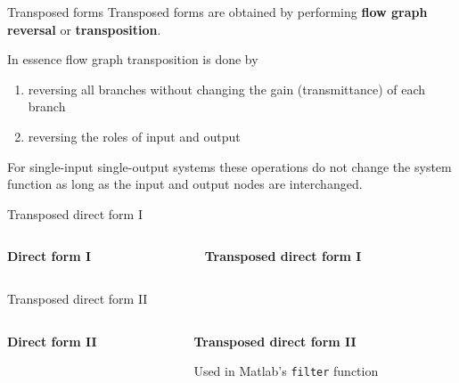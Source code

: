 \documentclass[10pt, aspectratio=169, handout]{beamer}
\begin{document}
\begin{frame}{Transposed forms}
	Transposed forms are obtained by performing \textbf{flow graph reversal} or \textbf{transposition}.

	In essence flow graph transposition is done by 
	\begin{enumerate}
		\item reversing all branches without changing the gain (transmittance) of each branch
		\item reversing the roles of input and output
	\end{enumerate}

	 For single-input single-output systems these operations do not change the system function as long as the input and output nodes are interchanged. 
\end{frame}

\begin{frame}{Transposed direct form I}
	\begin{columns}
		\begin{column}{0.5\textwidth}
			\textbf{Direct form I}
			\begin{center}
				\resizebox{\textwidth}{!}{}
			\end{center}
		\end{column}
		\begin{column}{0.5\textwidth}
			\textbf{Transposed direct form I}
			\begin{center}
				\resizebox{\textwidth}{!}{}
			\end{center}
		\end{column}
	\end{columns}
\end{frame}


\begin{frame}{Transposed direct form II}
	\begin{columns}[t]
		\begin{column}{0.5\textwidth}
			\textbf{Direct form II}
			\begin{center}
				\resizebox{0.8\textwidth}{!}{}
			\end{center}
		\end{column}
		\begin{column}{0.5\textwidth}
			\textbf{Transposed direct form II}
			\begin{center}
				\resizebox{0.8\textwidth}{!}{}
				
				\pause 
				Used in Matlab's \texttt{filter} function
			\end{center}
		\end{column}
	\end{columns}
\end{frame}
\end{document}
